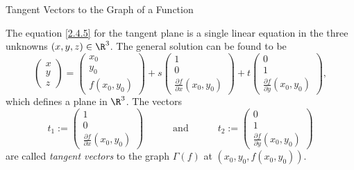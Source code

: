 \documentclass[smaller,hyperref={CJKbookmarks=true}]{beamer}
\begin{document}
\begin{frame}[t]{Tangent Vectors to the Graph of a Function}
\begin{spacing}{1}
The equation \eqref{2.4.5} for the tangent plane is a single linear equation in the
three unknowns $(x,y,z)\in\R^3$. The general solution can be found to be
\begin{equation}\label{2.4.6}
\begin{pmatrix}
  x \\
  y \\
  z
\end{pmatrix}=\begin{pmatrix}
                x_0 \\
                y_0 \\
                f(x_0,y_0)
              \end{pmatrix}+s\begin{pmatrix}
                               1 \\
                               0 \\
                               \frac{\partial f}{\partial x}(x_0,y_0)
                             \end{pmatrix}+t\begin{pmatrix}
                                              0 \\
                                              1 \\
                                              \frac{\partial f}{\partial y}(x_0,y_0)
                                            \end{pmatrix},
\end{equation}
which defines a plane in $\R^3$. The vectors
\begin{equation*}
  t_1:=\begin{pmatrix}
         1 \\
         0 \\
         \frac{\partial f}{\partial x}(x_0,y_0)
       \end{pmatrix}\qquad\quad\text{and}
       \qquad\quad t_2:=\begin{pmatrix}
                          0 \\
                          1 \\
                          \frac{\partial f}{\partial y}(x_0,y_0)
                        \end{pmatrix}
\end{equation*}
are called \emph{tangent vectors} to the graph $\Gamma(f)$ at $(x_0,y_0,f(x_0,y_0))$.
\end{spacing}
\end{frame}
\end{document}
